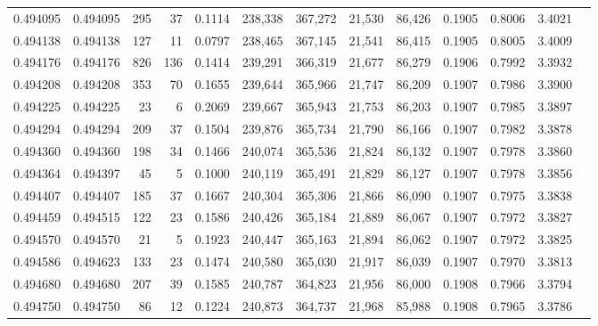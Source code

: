 \begin{tabular}{rrrrrrrrrrrrr}
0.494095 & 0.494095 &   295 &    37 &                                     0.1114 & 238,338 & 367,272 &  21,530 &  86,426 & 0.1905 & 0.8006 & 3.4021 \\
0.494138 & 0.494138 &   127 &    11 &                                     0.0797 & 238,465 & 367,145 &  21,541 &  86,415 & 0.1905 & 0.8005 & 3.4009 \\
0.494176 & 0.494176 &   826 &   136 &                                     0.1414 & 239,291 & 366,319 &  21,677 &  86,279 & 0.1906 & 0.7992 & 3.3932 \\
0.494208 & 0.494208 &   353 &    70 &                                     0.1655 & 239,644 & 365,966 &  21,747 &  86,209 & 0.1907 & 0.7986 & 3.3900 \\
0.494225 & 0.494225 &    23 &     6 &                                     0.2069 & 239,667 & 365,943 &  21,753 &  86,203 & 0.1907 & 0.7985 & 3.3897 \\
0.494294 & 0.494294 &   209 &    37 &                                     0.1504 & 239,876 & 365,734 &  21,790 &  86,166 & 0.1907 & 0.7982 & 3.3878 \\
0.494360 & 0.494360 &   198 &    34 &                                     0.1466 & 240,074 & 365,536 &  21,824 &  86,132 & 0.1907 & 0.7978 & 3.3860 \\
0.494364 & 0.494397 &    45 &     5 &                                     0.1000 & 240,119 & 365,491 &  21,829 &  86,127 & 0.1907 & 0.7978 & 3.3856 \\
0.494407 & 0.494407 &   185 &    37 &                                     0.1667 & 240,304 & 365,306 &  21,866 &  86,090 & 0.1907 & 0.7975 & 3.3838 \\
0.494459 & 0.494515 &   122 &    23 &                                     0.1586 & 240,426 & 365,184 &  21,889 &  86,067 & 0.1907 & 0.7972 & 3.3827 \\
0.494570 & 0.494570 &    21 &     5 &                                     0.1923 & 240,447 & 365,163 &  21,894 &  86,062 & 0.1907 & 0.7972 & 3.3825 \\
0.494586 & 0.494623 &   133 &    23 &                                     0.1474 & 240,580 & 365,030 &  21,917 &  86,039 & 0.1907 & 0.7970 & 3.3813 \\
0.494680 & 0.494680 &   207 &    39 &                                     0.1585 & 240,787 & 364,823 &  21,956 &  86,000 & 0.1908 & 0.7966 & 3.3794 \\
0.494750 & 0.494750 &    86 &    12 &                                     0.1224 & 240,873 & 364,737 &  21,968 &  85,988 & 0.1908 & 0.7965 & 3.3786 \\

\end{tabular}

